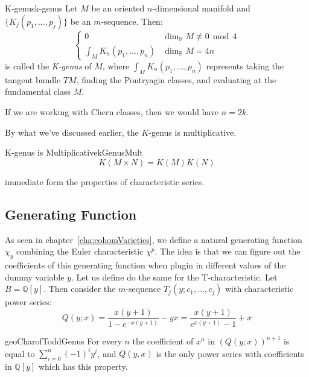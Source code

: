 \documentclass{book}
\newenvironment{Proof}[1][]
  {\begin{ProofTcb}[#1]}
  {\end{ProofTcb}}
\newcommand{\Q}{{\mathbb{Q}}}
\newcommand{\R}{{\mathbb{R}}}
\newcommand{\qn}{\quad\newline}
\renewcommand{\mod}{\,\operatorname{mod}\,}
\begin{document}
\begin{defn}{K-genus}{k-genus}
  Let $M$ be an oriented $n$-dimensional manifold and $\{K_j(p_1, ..., p_j)\}$ be an $m$-sequence. Then:
  \[
    \begin{cases}
      0 & \dim_\R M \not\equiv 0 \mod 4\\
      \int_M K_n(p_1, ..., p_n) & \dim_\R M = 4n
    \end{cases}
  \]
  is called the \emph{K-genus} of $M$, where $\int_M K_n(p_1, ..., p_n)$ represents taking the tangent bundle
  $TM$, finding the Pontryagin classes, and evaluating at the fundamental class $M$.

  \qn
  If we are working with Chern classes, then we would have $n=2k$.
\end{defn}

By what we've discussed earlier, the $K$-genus is multiplicative.
\begin{prop}{K-genus is Multiplicative}{kGenusMult}
  \[
    K(M\times N) = K(M)K(N)
  \]
\end{prop}

\begin{Proof}
  immediate form the properties of characteristic series.
\end{Proof}


\subsection{Generating Function}

As seen in chapter~\ref{cha:cohomVarieties}, we define a natural generating function $\chi_y$ combining the
Euler characteristic $\chi^p$. The idea is that we can figure out the coefficients of this generating
function when plugin in different values of the dummy variable $y$. Let us define do the same for the
T-characteristic. Let $B = \Q[y]$. Then consider the $m$-sequence $T_j(y; c_1, ..., c_j)$ with characteristic
power
series:
\[
  Q(y; x) = \frac{x(y+1)}{1-e^{-x(y+1)}} -yx = \frac{x(y+1)}{e^{x(y+1)}-1}+x
\]
\begin{lem}{}{geoCharofToddGenus}
  For every $n$ the coefficient of $x^n$ in $(Q(y;x))^{n+1}$ is equal to $\sum_{i=0}^n(-1)^iy^i$, and $Q(y,x)$
is the only power series with coefficients in $\mathbb{Q}[y]$ which has this property.
\end{lem}
\end{document}
